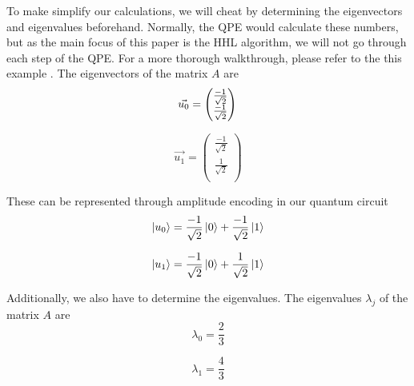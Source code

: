 To make simplify our calculations, we will cheat by determining the eigenvectors and eigenvalues beforehand.
Normally, the QPE would calculate these numbers, but as the main focus of this paper is the HHL algorithm, we will not go through each step of the QPE.
For a more thorough walkthrough, please refer to the this example \cite{step}.
The eigenvectors of the matrix $A$ are
\begin{equation}
\vec{u_0} = \begin{pmatrix} \frac{-1}{\sqrt{2}}\\ \frac{-1}{\sqrt{2}}\\ \end{pmatrix}\\
\end{equation}

\begin{equation}
\vec{u_1} = \begin{pmatrix} \frac{-1}{\sqrt{2}}\\ \frac{1}{\sqrt{2}}\\ \end{pmatrix}
\end{equation}

These can be represented through amplitude encoding in our quantum circuit
\begin{equation}
\ket{u_0} = \frac{-1}{\sqrt{2}}\ket{0} + \frac{-1}{\sqrt{2}}\ket{1}
\end{equation}

\begin{equation}
\ket{u_1}= \frac{-1}{\sqrt{2}}\ket{0} + \frac{1}{\sqrt{2}}\ket{1} 
\end{equation}

Additionally, we also have to determine the eigenvalues. The eigenvalues $\lambda_j$ of the matrix $A$ are
\begin{equation}
\lambda_0 = \frac{2}{3}
\end{equation}

\begin{equation}
\lambda_1 = \frac{4}{3}
\end{equation}

